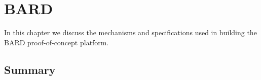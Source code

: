 %

\acresetall

\chapter{BARD}
\label{ch:BARD}


In this chapter we discuss the mechanisms and specifications used in building the BARD proof-of-concept platform.










  
\section{Summary}
\label{sec:SummaryBARD}



